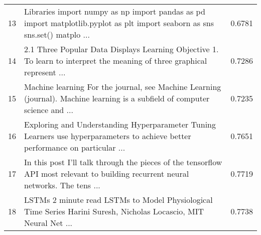 \begin{table}[htbp]
\begin{tabular}{|c|p{12cm}|c|}
13 &  Libraries  import numpy as np import pandas as pd import matplotlib.pyplot as plt import seaborn as sns  sns.set()  matplo ... & 0.6781 \\
14 &  2.1 Three Popular Data Displays   Learning Objective  1. To learn to interpret the meaning of three graphical represent ... & 0.7286 \\
15 &  Machine learning  For the journal, see Machine Learning (journal).  Machine learning is a subfield of computer science and  ... & 0.7235 \\
16 &  Exploring and Understanding Hyperparameter Tuning  Learners use hyperparameters to achieve better performance on particular ... & 0.7651 \\
17 & In this post I’ll talk through the pieces of the tensorflow API most relevant to building recurrent neural networks. The tens ... & 0.7719 \\
18 &  LSTMs  2 minute read     LSTMs to Model Physiological Time Series  Harini Suresh, Nicholas Locascio, MIT   Neural Net ... & 0.7738 \\
\bottomrule
\end{tabular}
\end{table}
